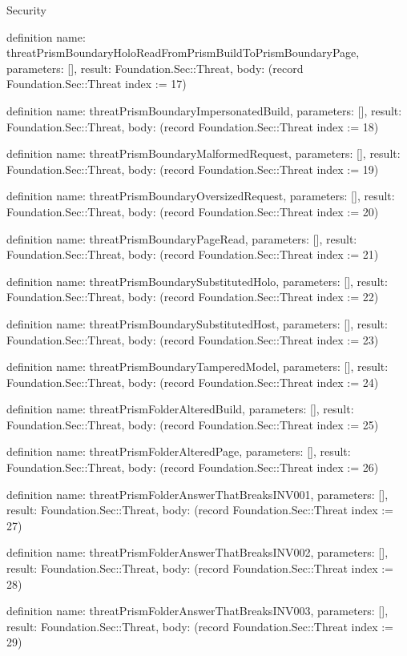 \begin{lexlean}{Security}
\begin{semanticmodule}
definition{
  name: threatPrismBoundaryHoloReadFromPrismBuildToPrismBoundaryPage,
  parameters: [],
  result: Foundation.Sec::Threat,
  body: (record Foundation.Sec::Threat {index := 17})
}

definition{
  name: threatPrismBoundaryImpersonatedBuild,
  parameters: [],
  result: Foundation.Sec::Threat,
  body: (record Foundation.Sec::Threat {index := 18})
}

definition{
  name: threatPrismBoundaryMalformedRequest,
  parameters: [],
  result: Foundation.Sec::Threat,
  body: (record Foundation.Sec::Threat {index := 19})
}

definition{
  name: threatPrismBoundaryOversizedRequest,
  parameters: [],
  result: Foundation.Sec::Threat,
  body: (record Foundation.Sec::Threat {index := 20})
}

definition{
  name: threatPrismBoundaryPageRead,
  parameters: [],
  result: Foundation.Sec::Threat,
  body: (record Foundation.Sec::Threat {index := 21})
}

definition{
  name: threatPrismBoundarySubstitutedHolo,
  parameters: [],
  result: Foundation.Sec::Threat,
  body: (record Foundation.Sec::Threat {index := 22})
}

definition{
  name: threatPrismBoundarySubstitutedHost,
  parameters: [],
  result: Foundation.Sec::Threat,
  body: (record Foundation.Sec::Threat {index := 23})
}

definition{
  name: threatPrismBoundaryTamperedModel,
  parameters: [],
  result: Foundation.Sec::Threat,
  body: (record Foundation.Sec::Threat {index := 24})
}

definition{
  name: threatPrismFolderAlteredBuild,
  parameters: [],
  result: Foundation.Sec::Threat,
  body: (record Foundation.Sec::Threat {index := 25})
}

definition{
  name: threatPrismFolderAlteredPage,
  parameters: [],
  result: Foundation.Sec::Threat,
  body: (record Foundation.Sec::Threat {index := 26})
}

definition{
  name: threatPrismFolderAnswerThatBreaksINV001,
  parameters: [],
  result: Foundation.Sec::Threat,
  body: (record Foundation.Sec::Threat {index := 27})
}

definition{
  name: threatPrismFolderAnswerThatBreaksINV002,
  parameters: [],
  result: Foundation.Sec::Threat,
  body: (record Foundation.Sec::Threat {index := 28})
}

definition{
  name: threatPrismFolderAnswerThatBreaksINV003,
  parameters: [],
  result: Foundation.Sec::Threat,
  body: (record Foundation.Sec::Threat {index := 29})
}


\end{semanticmodule}
\end{lexlean}
